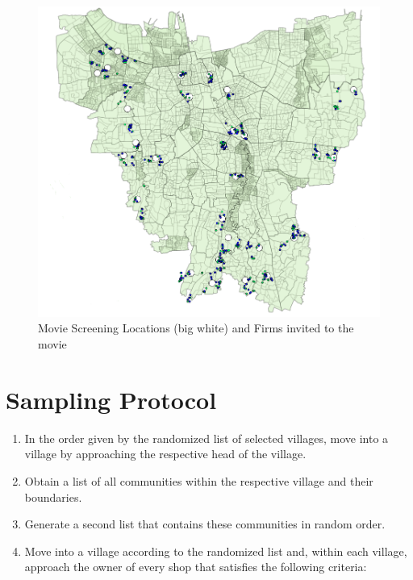 \documentclass[11.5pt]{article}
\begin{document}
{\begin{appendices}
\begin{landscape}
\pagebreak

\begin{figure}[h!]
    \centering
    \caption{Movie Screening Locations (big white) and Firms invited to the movie}
   	\includegraphics[width=120mm]{FigmapMovie.png}
\end{figure}

\end{landscape}
\pagebreak


\section{Sampling Protocol} \label{sec:appendixd}
\begin{enumerate}

	\item In the order given by the randomized list of selected villages, move 					into a village by approaching the respective head of the village.

	\item Obtain a list of all communities within the respective village and their 				boundaries.
	
	\item Generate a second list that contains these communities in random order.

	\item Move into a village according to the randomized list and, within each 				village, approach the owner of every shop that satisfies the following 				criteria:

	\begin{enumerate}
	

\end{enumerate}
\end{enumerate}
\end{appendices}}
\end{document}
